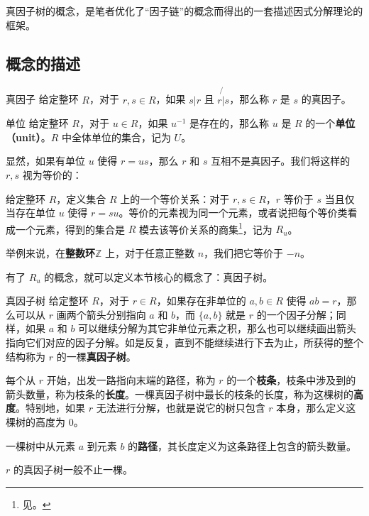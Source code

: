 

真因子树的概念，是笔者优化了“因子链”的概念而得出的一套描述因式分解理论的框架。

\subsection{概念的描述}

\begin{definition}{真因子}
给定整环 $R$，对于 $r, s\in R$，如果 $s|r$ 且 $r\not{|}s$，那么称 $r$ 是 $s$ 的真因子。
\end{definition}

\begin{definition}{单位}\label{def_FctTre_3}
给定整环 $R$，对于 $u\in R$，如果 $u^{-1}$ 是存在的，那么称 $u$ 是 $R$ 的一个\textbf{单位（unit）}。$R$ 中全体单位的集合，记为 $U$。
\end{definition}

显然，如果有单位 $u$ 使得 $r=us$，那么 $r$ 和 $s$ 互相不是真因子。我们将这样的 $r, s$ 视为等价的：

\begin{definition}{}\label{def_FctTre_2}
给定整环 $R$，定义集合 $R$ 上的一个等价关系：对于 $r, s\in R$，$r$ 等价于 $s$ 当且仅当存在单位 $u$ 使得 $r=su$。等价的元素视为同一个元素，或者说把每个等价类看成一个元素，得到的集合是 $R$ 模去该等价关系的商集\footnote{见。}，记为 $R_u$。
\end{definition}

举例来说，在\textbf{整数环}$\mathbb{Z}$ 上，对于任意正整数 $n$，我们把它等价于 $-n$。


有了 $R_u$ 的概念，就可以定义本节核心的概念了：真因子树。

\begin{definition}{真因子树}
给定整环 $R$，对于 $r\in R$，如果存在非单位的 $a, b\in R$ 使得 $ab=r$，那么可以从 $r$ 画两个箭头分别指向 $a$ 和 $b$，而 $\{a, b\}$ 就是 $r$ 的一个因子分解；同样，如果 $a$ 和 $b$ 可以继续分解为其它非单位元素之积，那么也可以继续画出箭头指向它们对应的因子分解。如是反复，直到不能继续进行下去为止，所获得的整个结构称为 $r$ 的一棵\textbf{真因子树}。

每个从 $r$ 开始，出发一路指向末端的路径，称为 $r$ 的一个\textbf{枝条}，枝条中涉及到的箭头数量，称为枝条的\textbf{长度}。一棵真因子树中最长的枝条的长度，称为这棵树的\textbf{高度}。特别地，如果 $r$ 无法进行分解，也就是说它的树只包含 $r$ 本身，那么定义这棵树的高度为 $0$。

一棵树中从元素 $a$ 到元素 $b$ 的\textbf{路径}，其长度定义为这条路径上包含的箭头数量。

$r$ 的真因子树一般不止一棵。
\end{definition}

